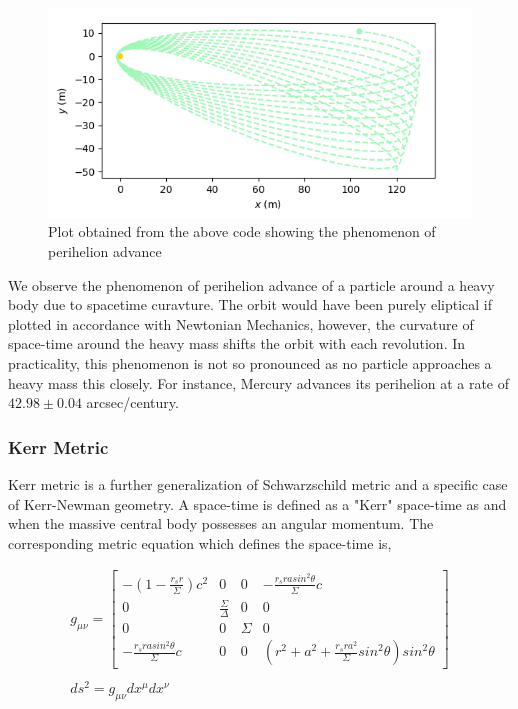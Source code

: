 \documentclass[refree]{aa}
\begin{document}
\begin{figure}[ht]
	\centering
	\includegraphics[scale=0.7]{figures/perihelion_cropped.png}
	\caption{Plot obtained from the above code showing the phenomenon of perihelion advance}
	\label{fig:schwarzschild}
\end{figure}

We observe the phenomenon of perihelion advance of a particle around a heavy body due to spacetime curavture. The orbit would have been purely eliptical if plotted in accordance with Newtonian Mechanics, however, the curvature of space-time around the heavy mass shifts the orbit with each revolution. In practicality, this phenomenon is not so pronounced as no particle approaches a heavy mass this closely. For instance, Mercury advances its perihelion at a rate of $42.98\pm 0.04$ arcsec/century.

\subsubsection{Kerr Metric}
Kerr metric \citep{Kerr:1963ud} is a further generalization of Schwarzschild metric and a specific case of Kerr-Newman geometry. A space-time is defined as a "Kerr" space-time as and when the massive central body possesses an angular momentum. The corresponding metric equation which defines the space-time is,

\begin{gather}
g_{\mu \nu} = \begin{bmatrix} - (1 - \frac{r_s r}{\Sigma})c^2 & 0 & 0 & -\frac{r_s r a sin^2 \theta}{\Sigma}c \\ 0 & \frac{\Sigma}{\Delta} & 0 & 0 \\ 0 & 0 & \Sigma & 0 \\ -\frac{r_s r a sin^2 \theta}{\Sigma}c & 0 & 0 &  (r^2 + a^2 + \frac{r_s r a^2}{\Sigma}sin^2 \theta) sin^2 \theta \end{bmatrix} \\ 
\nonumber \\
ds^2 = g_{\mu \nu} dx^\mu dx^\nu
\end{gather}
\end{document}
